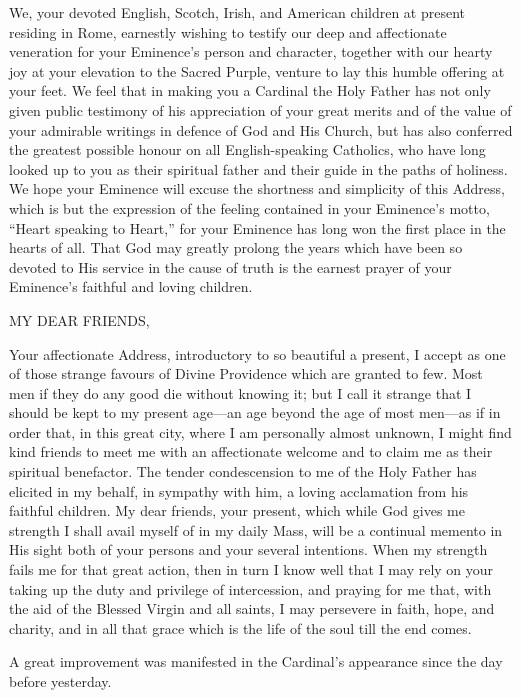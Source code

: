 We, your devoted English, Scotch, Irish, and American children at
present residing in Rome, earnestly wishing to testify our deep and
affectionate veneration for your Eminence's person and character,
together with our hearty joy at your elevation to the Sacred Purple,
venture to lay this humble offering at your feet. We feel that in
making you a Cardinal the Holy Father has not only given public
testimony of his appreciation of your great merits and of the value of
your admirable writings in defence of God and His Church, but has also
conferred the greatest possible honour on all English-speaking
Catholics, who have long looked up to you as their spiritual father
and their guide in the paths of holiness. We hope your Eminence will
excuse the shortness and simplicity of this Address, which is but
the expression of the feeling contained in your Eminence's motto,
``Heart speaking to Heart,'' for your Eminence has long won
the first place in the hearts of all. That God may greatly prolong the
years which have been so devoted to His service in the cause of truth
is the earnest prayer of your Eminence's faithful and loving children.


MY DEAR FRIENDS,

Your affectionate Address, introductory to so beautiful a present, I
accept as one of those strange favours of Divine Providence which are
granted to few. Most men if they do any good die without knowing it;
but I call it strange that I should be kept to my present age—an age
beyond the age of most men—as if in order that, in this great city,
where I am personally almost unknown, I might find kind friends to
meet me with an affectionate welcome and to claim me as their
spiritual benefactor. The tender condescension to me of the Holy
Father has elicited in my behalf, in sympathy with him, a loving acclamation from his faithful children. My dear friends, your present,
which while God gives me strength I shall avail myself of in my daily
Mass, will be a continual memento in His sight both of your persons
and your several intentions. When my strength fails me for that great
action, then in turn I know well that I may rely on your taking up the
duty and privilege of intercession, and praying for me that, with the
aid of the Blessed Virgin and all saints, I may persevere in faith,
hope, and charity, and in all that grace which is the life of the soul
till the end comes.

A great improvement was manifested in the Cardinal's appearance
since the day before yesterday.

